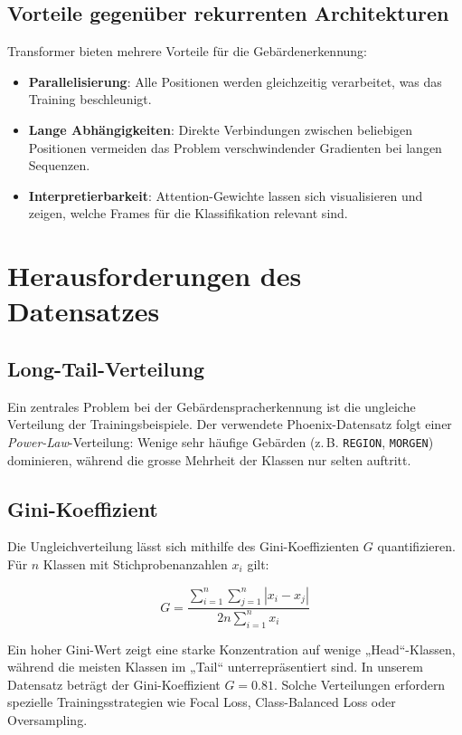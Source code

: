 \subsection{Vorteile gegenüber rekurrenten Architekturen}

Transformer bieten mehrere Vorteile für die Gebärdenerkennung:

\begin{itemize}
    \item \textbf{Parallelisierung}: Alle Positionen werden gleichzeitig verarbeitet, was das Training beschleunigt.
    \item \textbf{Lange Abhängigkeiten}: Direkte Verbindungen zwischen beliebigen Positionen vermeiden das Problem verschwindender Gradienten bei langen Sequenzen.
    \item \textbf{Interpretierbarkeit}: Attention-Gewichte lassen sich visualisieren und zeigen, welche Frames für die Klassifikation relevant sind.
\end{itemize}

\section{Herausforderungen des Datensatzes}

\subsection{Long-Tail-Verteilung}

Ein zentrales Problem bei der Gebärdenspracherkennung ist die ungleiche Verteilung der Trainingsbeispiele. Der verwendete Phoenix-Datensatz folgt einer \textit{Power-Law}-Verteilung: Wenige sehr häufige Gebärden (z.\,B. \texttt{REGION}, \texttt{MORGEN}) dominieren, während die grosse Mehrheit der Klassen nur selten auftritt.

\subsection{Gini-Koeffizient}

Die Ungleichverteilung lässt sich mithilfe des Gini-Koeffizienten $G$ quantifizieren. Für $n$ Klassen mit Stichprobenanzahlen $x_i$ gilt:

\begin{equation}
    G = \frac{\sum_{i=1}^n \sum_{j=1}^n |x_i - x_j|}{2n \sum_{i=1}^n x_i}
\end{equation}

Ein hoher Gini-Wert zeigt eine starke Konzentration auf wenige „Head“-Klassen, während die meisten Klassen im „Tail“ unterrepräsentiert sind. In unserem Datensatz beträgt der Gini-Koeffizient $G = 0.81$. Solche Verteilungen erfordern spezielle Trainingsstrategien wie Focal Loss, Class-Balanced Loss oder Oversampling.

